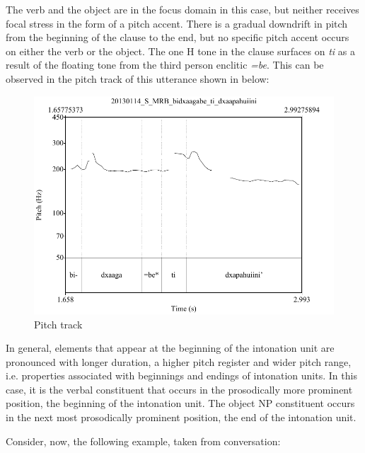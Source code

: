 The verb and the object are in the focus domain in this case, but neither receives focal stress in the form of a pitch accent. There is a gradual downdrift in pitch from the beginning of the clause to the end, but no specific pitch accent occurs on either the verb or the object. The one H tone in the clause surfaces on \textit{ti} as a result of the floating tone from the third person enclitic \textit{=be}. This can be observed in the pitch track of this utterance shown in  below:

\begin{figure} 
\caption{Pitch track}
\label{fig:5:dxaapahuiini}
\includegraphics[height=.4\textheight]{dxaapahuiini}
\end{figure}


In general, elements that appear at the beginning of the intonation unit are pronounced with longer duration, a higher pitch register and wider pitch range, i.e. properties associated with beginnings and endings of intonation units. In this case, it is the verbal constituent that occurs in the prosodically more prominent position, the beginning of the intonation unit. The object NP constituent occurs in the next most prosodically prominent position, the end of the intonation unit.

Consider, now, the following example, taken from conversation:

